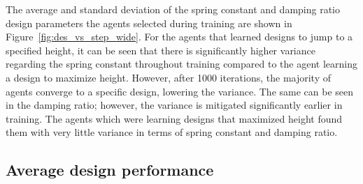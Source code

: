 The average and standard deviation of the spring constant and damping ratio design parameters the agents selected during training are shown in Figure~\ref{fig:des_vs_step_wide}. For the agents that learned designs to jump to a specified height, it can be seen that there is significantly higher variance regarding the spring constant throughout training compared to the agent learning a design to maximize height. However, after 1000 iterations, the majority of agents converge to a specific design, lowering the variance. The same can be seen in the damping ratio; however, the variance is mitigated significantly earlier in training. The agents which were learning designs that maximized height found them with very little variance in terms of spring constant and damping ratio. 
% 
\subsection{Average design performance}
% 
